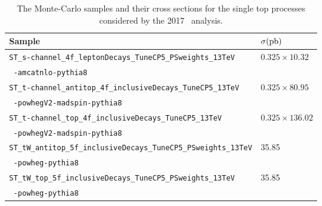 \begin{table}[htbp]
  \caption[Single Top Samples for \VHbb\ 2017]{The Monte-Carlo samples and their cross sections for the single top processes considered by the 2017 \VHbb\ analysis.}
  \label{tbl:MCsingletop}
  \small
  \begin{tabularx}{6.5in}{lX}
    \hline
    Sample                                                                   & $\sigma (\mathrm{pb})$        \\
    \hline
    \texttt{ST\_s-channel\_4f\_leptonDecays\_TuneCP5\_PSweights\_13TeV}      & $0.325 \times 10.32$  \\
    \texttt{  -amcatnlo-pythia8}                                             &                       \\
    \texttt{ST\_t-channel\_antitop\_4f\_inclusiveDecays\_TuneCP5\_13TeV}     & $0.325 \times 80.95$  \\
    \texttt{  -powhegV2-madspin-pythia8}                                     &                       \\
    \texttt{ST\_t-channel\_top\_4f\_inclusiveDecays\_TuneCP5\_13TeV}         & $0.325 \times 136.02$ \\
    \texttt{  -powhegV2-madspin-pythia8}                                     &                       \\
    \texttt{ST\_tW\_antitop\_5f\_inclusiveDecays\_TuneCP5\_PSweights\_13TeV} & 35.85                 \\
    \texttt{  -powheg-pythia8}                                               &                       \\
    \texttt{ST\_tW\_top\_5f\_inclusiveDecays\_TuneCP5\_PSweights\_13TeV}     & 35.85                 \\
    \texttt{  -powheg-pythia8}                                               &                       \\
    \hline
  \end{tabularx}
\end{table}

